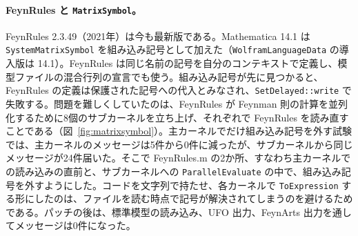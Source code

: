 \documentclass[a4paper,10pt]{ltjsarticle}
\newcommand{\bq}{\textasciigrave}
\begin{document}
\paragraph{FeynRules と \texttt{MatrixSymbol}。}FeynRules 2.3.49（2021年）は今も最新版である。Mathematica 14.1 は \texttt{System\bq MatrixSymbol} を組み込み記号として加えた（\texttt{WolframLanguageData} の導入版は 14.1）。FeynRules は同じ名前の記号を自分のコンテキストで定義し、模型ファイルの混合行列の宣言でも使う。組み込み記号が先に見つかると、FeynRules の定義は保護された記号への代入とみなされ、\texttt{SetDelayed::write} で失敗する。問題を難しくしていたのは、FeynRules が Feynman 則の計算を並列化するために8個のサブカーネルを立ち上げ、それぞれで FeynRules を読み直すことである（図~\ref{fig:matrixsymbol}）。主カーネルでだけ組み込み記号を外す試験では、主カーネルのメッセージは5件から0件に減ったが、サブカーネルから同じメッセージが24件届いた。そこで FeynRules.m の2か所、すなわち主カーネルでの読み込みの直前と、サブカーネルへの \texttt{ParallelEvaluate} の中で、組み込み記号を外すようにした。コードを文字列で持たせ、各カーネルで \texttt{ToExpression} する形にしたのは、ファイルを読む時点で記号が解決されてしまうのを避けるためである。パッチの後は、標準模型の読み込み、UFO 出力、FeynArts 出力を通してメッセージは0件になった。
\end{document}

